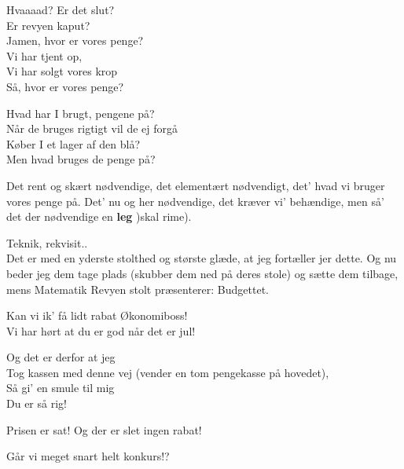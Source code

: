 \documentclass[a4paper,11pt]{article}
\begin{document}
\begin{sketch}

 Hvaaaad? Er det slut? \\
Er revyen kaput? \\
Jamen, hvor er vores penge? \\
Vi har tjent op, \\
Vi har solgt vores krop \\
Så, hvor er vores penge?


 Hvad har I brugt, pengene på? \\
Når de bruges rigtigt vil de ej forgå \\
Køber I et lager af den blå? \\
Men hvad bruges de penge på?


 Det rent og skært nødvendige, det elementært nødvendigt, det' hvad vi bruger vores penge på. Det' nu og her nødvendige, det kræver vi' behændige, men så' det der nødvendige en \textbf{leg} )skal rime).



 Teknik, rekvisit.. \\
Det er med en yderste stolthed og største glæde, at jeg fortæller jer
dette. Og nu beder jeg dem tage plads (skubber dem ned på deres stole) og sætte dem tilbage, mens Matematik Revyen stolt præsenterer: Budgettet.


 Kan vi ik' få lidt rabat Økonomiboss! \\
Vi har hørt at du er god når det er jul!

 Og det er derfor at jeg \\
Tog kassen med denne vej (vender en tom pengekasse på hovedet), \\
Så gi' en smule til mig \\
Du er så rig!


 Prisen er sat! Og der er slet ingen rabat!


 Går vi meget snart helt konkurs!?


\end{sketch}
\end{document}
